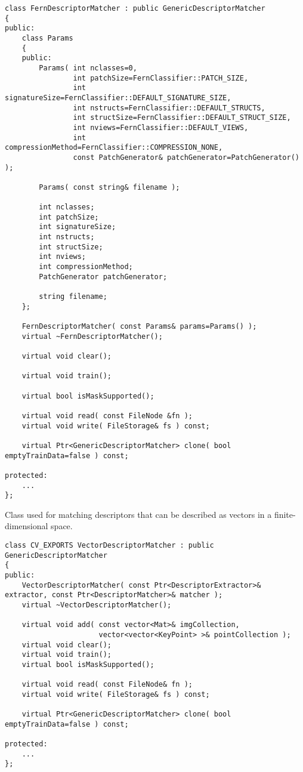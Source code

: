 \begin{lstlisting}
class FernDescriptorMatcher : public GenericDescriptorMatcher
{
public:
    class Params
    {
    public:
        Params( int nclasses=0,
                int patchSize=FernClassifier::PATCH_SIZE,
                int signatureSize=FernClassifier::DEFAULT_SIGNATURE_SIZE,
                int nstructs=FernClassifier::DEFAULT_STRUCTS,
                int structSize=FernClassifier::DEFAULT_STRUCT_SIZE,
                int nviews=FernClassifier::DEFAULT_VIEWS,
                int compressionMethod=FernClassifier::COMPRESSION_NONE,
                const PatchGenerator& patchGenerator=PatchGenerator() );

        Params( const string& filename );

        int nclasses;
        int patchSize;
        int signatureSize;
        int nstructs;
        int structSize;
        int nviews;
        int compressionMethod;
        PatchGenerator patchGenerator;

        string filename;
    };

    FernDescriptorMatcher( const Params& params=Params() );
    virtual ~FernDescriptorMatcher();

    virtual void clear();

    virtual void train();

    virtual bool isMaskSupported();

    virtual void read( const FileNode &fn );
    virtual void write( FileStorage& fs ) const;
    
    virtual Ptr<GenericDescriptorMatcher> clone( bool emptyTrainData=false ) const;

protected:
	...
};
\end{lstlisting}

Class used for matching descriptors that can be described as vectors in a finite-dimensional space.

\begin{lstlisting}
class CV_EXPORTS VectorDescriptorMatcher : public GenericDescriptorMatcher
{
public:
    VectorDescriptorMatcher( const Ptr<DescriptorExtractor>& extractor, const Ptr<DescriptorMatcher>& matcher );
    virtual ~VectorDescriptorMatcher();

    virtual void add( const vector<Mat>& imgCollection,
                      vector<vector<KeyPoint> >& pointCollection );
    virtual void clear();
    virtual void train();
    virtual bool isMaskSupported();

    virtual void read( const FileNode& fn );
    virtual void write( FileStorage& fs ) const;

    virtual Ptr<GenericDescriptorMatcher> clone( bool emptyTrainData=false ) const;

protected:
    ...
};
\end{lstlisting}

